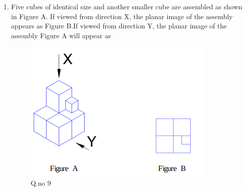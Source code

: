 \documentclass[journal,12pt,onecolumn]{IEEEtran}
\theoremstyle{remark}
\begin{document}
\begin{enumerate}
\item Five cubes of identical size and another smaller cube are assembled as shown in Figure A. If viewed from direction X, the planar image of the assembly appears as Figure B.If viewed from direction Y, the planar image of the assembly Figure A will appear as 
\begin{figure}[h!]
    \centering
    \includegraphics[width=0.3\columnwidth]{figs/question.png}
    \caption*{Q.no 9}
    \label{fig:q9}
\end{figure}
\hfill{}
\begin{enumerate}
\end{enumerate}
\end{enumerate}
\end{document}
